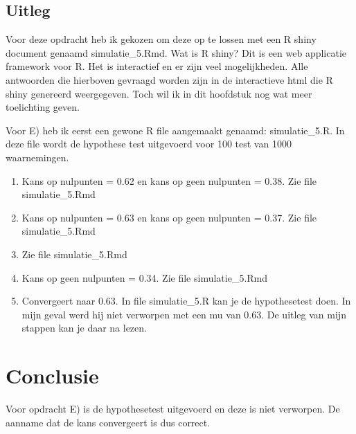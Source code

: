 \documentclass{article}
\begin{document}
\newpage
\subsection{Uitleg}
\label{subsec:sample_uitv}



Voor deze opdracht heb ik gekozen om deze op te lossen met een R shiny document genaamd simulatie\_5.Rmd. Wat is R shiny? Dit is een web applicatie framework voor R. Het is interactief en er zijn veel mogelijkheden. Alle antwoorden die hierboven gevraagd worden zijn in de interactieve html die R shiny genereerd weergegeven. Toch wil ik in dit hoofdstuk nog wat meer toelichting geven. 


Voor E) heb ik eerst een gewone R file aangemaakt genaamd: simulatie\_5.R. In deze file wordt de hypothese test uitgevoerd voor 100 test van 1000 waarnemingen.
\begin{enumerate}[label=(\Alph*)]
\item Kans op nulpunten = 0.62 en kans op geen nulpunten = 0.38. Zie file simulatie\_5.Rmd
\item Kans op nulpunten = 0.63 en kans op geen nulpunten = 0.37. Zie file simulatie\_5.Rmd
\item Zie file simulatie\_5.Rmd
\item Kans op geen nulpunten = 0.34. Zie file simulatie\_5.Rmd
\item Convergeert naar 0.63. In file simulatie\_5.R kan je de hypothesetest doen. In mijn geval werd hij niet verworpen met een mu van 0.63. De uitleg van mijn stappen kan je daar na lezen.
\end{enumerate}


\section{Conclusie}
\label{subsec:sample_con}
Voor opdracht E) is de hypothesetest uitgevoerd en deze is niet verworpen. De aanname dat de kans convergeert is dus correct.
\end{document}
